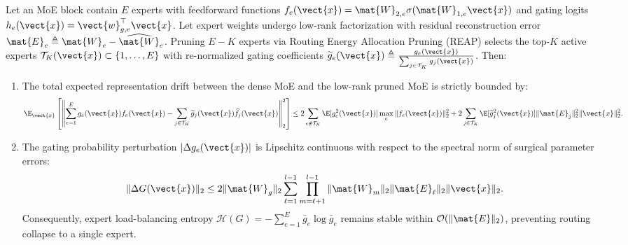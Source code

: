 \begin{theorem}
\label{thm:reap_routing_stability}
Let an MoE block contain $E$ experts with feedforward functions $f_e(\vect{x}) = \mat{W}_{2,e} \sigma(\mat{W}_{1,e} \vect{x})$ and gating logits $h_e(\vect{x}) = \vect{w}_{g,e}^\top \vect{x}$. Let expert weights undergo low-rank factorization with residual reconstruction error $\mat{E}_e \triangleq \mat{W}_e - \widehat{\mat{W}}_e$. Pruning $E - K$ experts via Routing Energy Allocation Pruning (REAP) selects the top-$K$ active experts $\mathcal{T}_K(\vect{x}) \subset \{1, \dots, E\}$ with re-normalized gating coefficients $\widetilde{g}_e(\vect{x}) \triangleq \frac{g_e(\vect{x})}{\sum_{j \in \mathcal{T}_K} g_j(\vect{x})}$. Then:
\begin{enumerate}
    \item The total expected representation drift between the dense MoE and the low-rank pruned MoE is strictly bounded by:
    \begin{equation}
    \E_{\vect{x}} \left[ \left\| \sum_{e=1}^E g_e(\vect{x}) f_e(\vect{x}) - \sum_{j \in \mathcal{T}_K} \widetilde{g}_j(\vect{x}) \widehat{f}_j(\vect{x}) \right\|_2^2 \right] \le 2 \sum_{e \notin \mathcal{T}_K} \E[g_e^2(\vect{x})] \max_e \|f_e(\vect{x})\|_2^2 + 2 \sum_{j \in \mathcal{T}_K} \E[\widetilde{g}_j^2(\vect{x})] \| \mat{E}_j \|_2^2 \|\vect{x}\|_2^2.
    \label{eq:thm5_drift_bound}
    \end{equation}
    \item The gating probability perturbation $|\Delta g_e(\vect{x})|$ is Lipschitz continuous with respect to the spectral norm of surgical parameter errors:
    \begin{equation}
    \| \Delta G(\vect{x}) \|_2 \le 2 \|\mat{W}_g\|_2 \sum_{\ell=1}^{l-1} \prod_{m=\ell+1}^{l-1} \|\mat{W}_m\|_2 \| \mat{E}_\ell \|_2 \|\vect{x}\|_2.
    \label{eq:thm5_gating_perturbation}
    \end{equation}
    Consequently, expert load-balancing entropy $\mathcal{H}(G) = - \sum_{e=1}^E \bar{g}_e \log \bar{g}_e$ remains stable within $\mathcal{O}(\|\mat{E}\|_2)$, preventing routing collapse to a single expert.
\end{enumerate}
\end{theorem}

